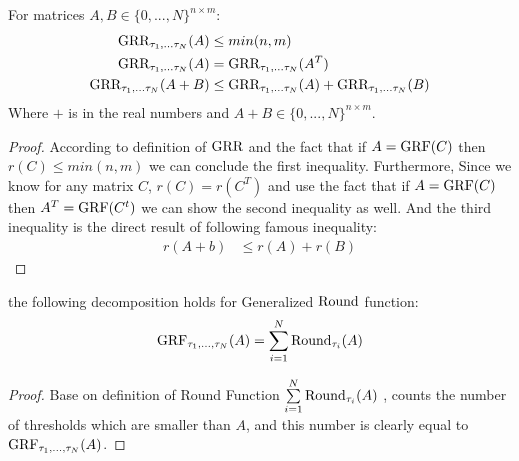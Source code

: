 \documentclass{article}
\begin{document}
\begin{thm:lemma}
For matrices $A ,B \in \{0,...,N\}^{n \times m}$:
\begin{align}
\text{GRR}_{\tau_1,...\tau_N}(A) &\leq min(n,m)\\
 \text{GRR}_{\tau_1,...\tau_N}(A) &=\text{GRR}_{\tau_1,...\tau_N}(A^T)\\
 \text{GRR}_{\tau_1,...\tau_N}(A+B) &\leq \text{GRR}_{\tau_1,...\tau_N}(A)+\text{GRR}_{\tau_1,...\tau_N}(B)
\end{align}
Where $+$ is in the real numbers and $A+B \in \{0,...,N\}^{n \times m}$.
\begin{proof}
According to definition of $\text{GRR}$ and the fact that if $A=\text{GRF}(C)$ then $ r(C) \leq min(n,m)$ we can conclude the first inequality. Furthermore, Since we know for any matrix $C$, $r(C)=r(C^T)$ and use the fact that if $A=\text{GRF}(C)$ then $A^T=\text{GRF}(C^t)$ we can show the second inequality as well. And the third inequality is the direct result of following famous inequality:
\begin{align}
r(A+b) &\leq r(A)+r(B)
\end{align}
\end{proof}
\end{thm:lemma}

\begin{thm:lemma}

the following decomposition holds for Generalized $\text{Round}$ function: 
\begin{align}
\text{GRF}_{\tau_1,...,\tau_N}(A)=\sum\limits_{i=1}^{N}\text{Round}_{\tau_i}(A) 
\end{align}
\begin{proof}
Base on definition of Round Function $\sum\limits_{i=1}^{N}\text{Round}_{\tau_i}(A)$ , counts the number of thresholds which are smaller than $A$, and this number is clearly equal to  $\text{GRF}_{\tau_1,...,\tau_N}(A)$.
\end{proof}
\end{thm:lemma}
\end{document}
